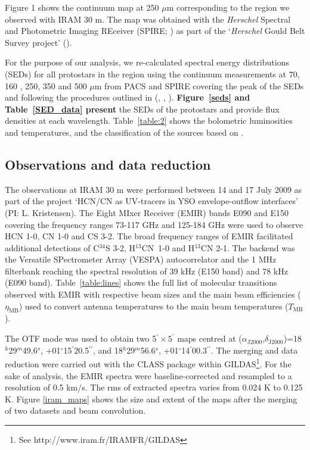 \documentclass{aa}
\begin{document}
Figure 1 shows the continuum map at 250 $\mu$m corresponding to the region we observed with 
IRAM 30 m. The map was obtained with the \textit{Herschel} Spectral and Photometric Imaging 
REceiver (SPIRE; \citealt{Gri10}) as part of the ‘\textit{Herschel} Gould Belt Survey project' (\citealt{And10}). 

For the purpose of our analysis, we re-calculated spectral energy distributions (SEDs) for 
all protostars in the region using the continuum measurements at 70, 160 , 250, 350 and 500 $\mu$m 
from PACS and SPIRE covering the peak of the SEDs and following the procedures outlined in (\citealt{And10}, \citealt{Kir13}, \citealt{Kon15}).
\textbf{Figure~\ref{seds} and Table~\ref{SED_data} present} the SEDs of the protostars and provide flux densities at each wavelength. Table~\ref{table:2} shows the bolometric luminosities
and temperatures, and the classification of the sources based on \citet{Eva09}.

\subsection{Observations and data reduction}
\label{subsection:data}
The observations at IRAM 30 m were performed between 14 and 17 July 2009 as part of the project ‘HCN/CN as UV-tracers in YSO envelope-outflow interfaces’ (PI: L. Kristensen). The Eight MIxer Receiver (EMIR) bands E090 and E150 covering the frequency ranges 73-117 GHz and 125-184 GHz were used to observe HCN 1-0, CN 1-0 and CS 3-2. The broad frequency ranges of EMIR facilitated additional detections 
of C$^{34}$S 3-2, H$^{13}$CN~\mbox{1-0} and H$^{13}$CN 2-1. The
backend was the Versatile SPectrometer Array (VESPA) autocorrelator and the 1 MHz filterbank
reaching the spectral resolution of 39 kHz (E150 band) and 78 kHz (E090 band).
Table~\ref{table:lines} shows the full list of molecular transitions observed with EMIR with 
respective beam sizes and the main beam efficiencies ($\eta_{\mathrm{MB}}$) used to convert antenna temperatures 
to the main beam temperatures ($T_{\mathrm{MB}}$). 

The OTF mode was used to obtain two 5$^{\prime}\times5^{\prime}$ maps centred at ($\alpha_\mathrm{J2000}$,$\delta_\mathrm{J2000}$)=18$^h$29$^m$49.6$^s$,
+01$^{\circ}$15$^{\prime}$20.5$^{\prime\prime}$, and 18$^h$29$^m$56.6$^s$, +01$^{\circ}$14$^{\prime}$00.3$^{\prime\prime}$. 
The merging and data reduction were carried out with the CLASS package within GILDAS\footnote{See
http://www.iram.fr/IRAMFR/GILDAS}. For the sake of analysis, the EMIR spectra were
baseline-corrected and resampled to a resolution of 0.5 km/s. The rms of extracted spectra varies from 0.024 K to 0.125 K. Figure \ref{iram_maps} shows the size and extent of the maps after the merging of two datasets and beam convolution.
\end{document}
